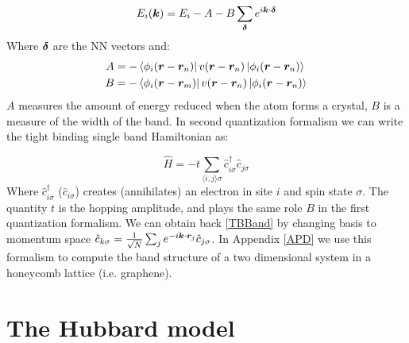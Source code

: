 \begin{equation}
\label{TBBand}
E_i(\boldsymbol{k}) = E_i - A - B\sum_{\boldsymbol{\delta}} e^{i\boldsymbol{k}\cdot \boldsymbol{\delta}}
\end{equation}
Where $\boldsymbol{\delta}$ are the NN vectors and:
\begin{align*}
A &= -\bra{\phi_i(\boldsymbol{r}-\boldsymbol{r}_n)}v(\boldsymbol{r}-\boldsymbol{r}_n) \ket{\phi_i(\boldsymbol{r}-\boldsymbol{r}_n)} \\
B &= -\bra{\phi_i(\boldsymbol{r}-\boldsymbol{r}_m)}v(\boldsymbol{r}-\boldsymbol{r}_n) \ket{\phi_i(\boldsymbol{r}-\boldsymbol{r}_n)}
\end{align*}
$A$ measures the amount of energy reduced when the atom forms a crystal, $B$ is a measure of the width of the band. 
In second quantization formalism we can write the tight binding single band Hamiltonian as:

\begin{equation}
\label{TBModel}
\hat{H} = -t\sum_{\langle i,j \rangle \sigma} \hat{c}^{\dagger}_{i\sigma}\hat{c}_{j\sigma}
\end{equation}
Where $\hat{c}^{\dagger}_{i\sigma}$ ($\hat{c}_{i\sigma}$) creates (annihilates) an electron in site $i$ and spin state $\sigma$. The quantity $t$ is the hopping amplitude, and plays the same role $B$ in the first quantization formalism. We can obtain back \ref{TBBand} by changing basis to momentum space $\hat{c}_{k\sigma} = \frac{1}{\sqrt{N}}\sum_j e^{-i\boldsymbol{k}\cdot\boldsymbol{r}_j}\hat{c}_{j\sigma}$. In Appendix \ref{APD} we use this formalism to compute the band structure of a two dimensional system in a honeycomb lattice (i.e. graphene).



\section{The Hubbard model}


